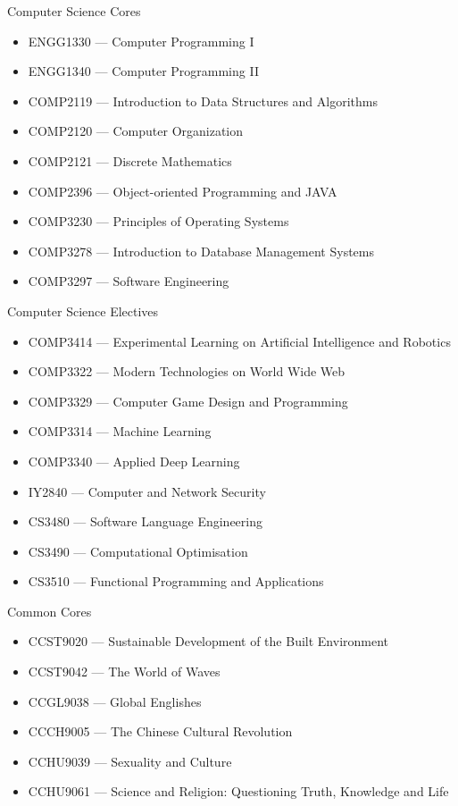 \documentclass{article}
\begin{document}
Computer Science Cores
\begin{itemize}
    \item[] ENGG1330 --- Computer Programming I
    \item[] ENGG1340 --- Computer Programming II
    \item[] COMP2119 --- Introduction to Data Structures and Algorithms
    \item[] COMP2120 --- Computer Organization
    \item[] COMP2121 --- Discrete Mathematics
    \item[] COMP2396 --- Object-oriented Programming and JAVA
    \item[] COMP3230 --- Principles of Operating Systems
    \item[] COMP3278 --- Introduction to Database Management Systems
    \item[] COMP3297 --- Software Engineering
\end{itemize}

Computer Science Electives
\begin{itemize}
    \item[] COMP3414 --- Experimental Learning on Artificial Intelligence and Robotics
    \item[] COMP3322 --- Modern Technologies on World Wide Web
    \item[] COMP3329 --- Computer Game Design and Programming
    \item[] COMP3314 --- Machine Learning
    \item[] COMP3340 --- Applied Deep Learning

    \item[] IY2840 --- Computer and Network Security
    \item[] CS3480 --- Software Language Engineering
    \item[] CS3490 --- Computational Optimisation
    \item[] CS3510 --- Functional Programming and Applications
\end{itemize}

Common Cores
\begin{itemize}
    \item[] CCST9020 --- Sustainable Development of the Built Environment
    \item[] CCST9042 --- The World of Waves
    \item[] CCGL9038 --- Global Englishes
    \item[] CCCH9005 --- The Chinese Cultural Revolution
    \item[] CCHU9039 --- Sexuality and Culture
    \item[] CCHU9061 --- Science and Religion: Questioning Truth, Knowledge and Life
\end{itemize}
\end{document}
